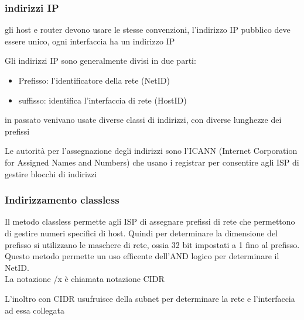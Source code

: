 \documentclass[12pt, a4paper]{article}
\begin{document}
\subsubsection{indirizzi IP}
gli host e router devono usare le stesse convenzioni, l'indirizzo IP pubblico deve essere unico, ogni
interfaccia ha un indirizzo IP

Gli indirizzi IP sono generalmente divisi in due parti: 
\begin{itemize}
    \item Prefisso: l'identificatore della rete (NetID)
    \item suffisso: identifica l'interfaccia di rete (HostID)
\end{itemize}
in passato venivano usate diverse classi di indirizzi, con diverse lunghezze dei prefissi

Le autorità per l'assegnazione degli indirizzi sono l'ICANN (Internet Corporation for Assigned Names and Numbers)
che usano i registrar per consentire agli ISP di gestire blocchi di indirizzi

\subsubsection{Indirizzamento classless}
Il metodo classless permette agli ISP di assegnare prefissi di rete che permettono di gestire numeri specifici 
di host. Quindi per determinare la dimensione del prefisso si utilizzano le maschere di rete, ossia 32 bit 
impostati a 1 fino al prefisso. Questo metodo permette un uso efficente dell'AND logico per determinare il NetID.
\\La notazione /x è chiamata notazione CIDR

L'inoltro con CIDR usufruisce della subnet per determinare la rete e l'interfaccia ad essa collegata

\end{document}

